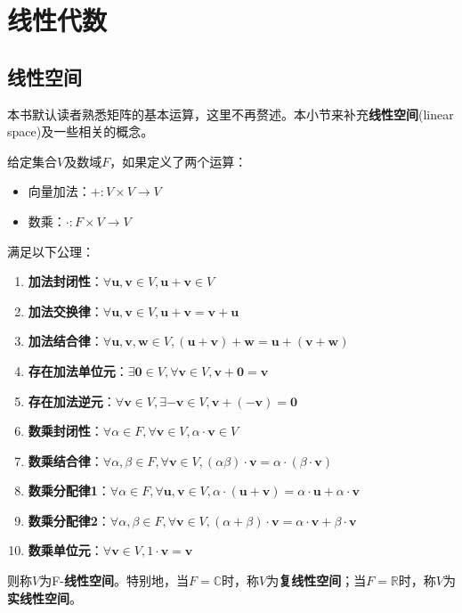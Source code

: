 \section{线性代数}\label{sec:Linear_Algebra}

\subsection{线性空间}\label{sub:linear_space}

本书默认读者熟悉矩阵的基本运算，这里不再赘述。本小节来补充\textbf{线性空间}(linear space)及一些相关的概念\cite{linear_algebra}。

\begin{definition}[线性空间]
    给定集合$V$及数域$F$，如果定义了两个运算：
    \begin{itemize}
        \item 向量加法：$+:V\times V\rightarrow V$
        \item 数乘：$\cdot :F\times V\rightarrow V$
    \end{itemize}
    满足以下公理：
    \begin{enumerate}
        \item \textbf{加法封闭性}：$\forall \mathbf{u},\mathbf{v}\in V,\mathbf{u}+\mathbf{v}\in V$
        \item \textbf{加法交换律}：$\forall \mathbf{u},\mathbf{v}\in V,\mathbf{u}+\mathbf{v}=\mathbf{v}+\mathbf{u}$
        \item \textbf{加法结合律}：$\forall \mathbf{u},\mathbf{v},\mathbf{w}\in V,(\mathbf{u}+\mathbf{v})+\mathbf{w}=\mathbf{u}+(\mathbf{v}+\mathbf{w})$
        \item \textbf{存在加法单位元}：$\exists \mathbf{0}\in V,\forall \mathbf{v}\in V,\mathbf{v}+\mathbf{0}=\mathbf{v}$
        \item \textbf{存在加法逆元}：$\forall \mathbf{v}\in V,\exists -\mathbf{v}\in V,\mathbf{v}+(-\mathbf{v})=\mathbf{0}$
        \item \textbf{数乘封闭性}：$\forall \alpha\in F,\forall \mathbf{v}\in V,\alpha\cdot\mathbf{v}\in V$
        \item \textbf{数乘结合律}：$\forall \alpha,\beta\in F,\forall \mathbf{v}\in V,(\alpha\beta)\cdot\mathbf{v}=\alpha\cdot(\beta\cdot\mathbf{v})$
        \item \textbf{数乘分配律1}：$\forall \alpha\in F,\forall \mathbf{u},\mathbf{v}\in V,\alpha\cdot(\mathbf{u}+\mathbf{v})=\alpha\cdot\mathbf{u}+\alpha\cdot\mathbf{v}$
        \item \textbf{数乘分配律2}：$\forall \alpha,\beta\in F,\forall \mathbf{v}\in V,(\alpha+\beta)\cdot\mathbf{v}=\alpha\cdot\mathbf{v}+\beta\cdot\mathbf{v}$
        \item \textbf{数乘单位元}：$\forall \mathbf{v}\in V,1\cdot\mathbf{v}=\mathbf{v}$
    \end{enumerate}
    则称$V$为F-\textbf{线性空间}。特别地，当$F=\mathbb{C}$时，称$V$为\textbf{复线性空间}；当$F=\mathbb{R}$时，称$V$为\textbf{实线性空间}。
\end{definition}

